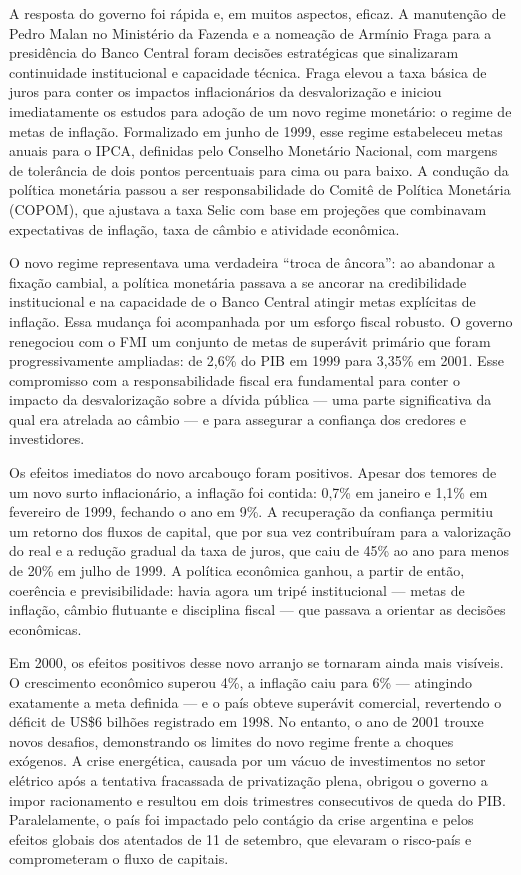 \documentclass[a4paper,12pt]{article}[abntex2]
\begin{document}
A resposta do governo foi rápida e, em muitos aspectos, eficaz. A manutenção de Pedro Malan no Ministério da Fazenda e a nomeação de Armínio Fraga para a presidência do Banco Central foram decisões estratégicas que sinalizaram continuidade institucional e capacidade técnica. Fraga elevou a taxa básica de juros para conter os impactos inflacionários da desvalorização e iniciou imediatamente os estudos para adoção de um novo regime monetário: o regime de metas de inflação. Formalizado em junho de 1999, esse regime estabeleceu metas anuais para o IPCA, definidas pelo Conselho Monetário Nacional, com margens de tolerância de dois pontos percentuais para cima ou para baixo. A condução da política monetária passou a ser responsabilidade do Comitê de Política Monetária (COPOM), que ajustava a taxa Selic com base em projeções que combinavam expectativas de inflação, taxa de câmbio e atividade econômica.

O novo regime representava uma verdadeira “troca de âncora”: ao abandonar a fixação cambial, a política monetária passava a se ancorar na credibilidade institucional e na capacidade de o Banco Central atingir metas explícitas de inflação. Essa mudança foi acompanhada por um esforço fiscal robusto. O governo renegociou com o FMI um conjunto de metas de superávit primário que foram progressivamente ampliadas: de 2,6\% do PIB em 1999 para 3,35\% em 2001. Esse compromisso com a responsabilidade fiscal era fundamental para conter o impacto da desvalorização sobre a dívida pública — uma parte significativa da qual era atrelada ao câmbio — e para assegurar a confiança dos credores e investidores.

Os efeitos imediatos do novo arcabouço foram positivos. Apesar dos temores de um novo surto inflacionário, a inflação foi contida: 0,7\% em janeiro e 1,1\% em fevereiro de 1999, fechando o ano em 9\%. A recuperação da confiança permitiu um retorno dos fluxos de capital, que por sua vez contribuíram para a valorização do real e a redução gradual da taxa de juros, que caiu de 45\% ao ano para menos de 20\% em julho de 1999. A política econômica ganhou, a partir de então, coerência e previsibilidade: havia agora um tripé institucional — metas de inflação, câmbio flutuante e disciplina fiscal — que passava a orientar as decisões econômicas.

Em 2000, os efeitos positivos desse novo arranjo se tornaram ainda mais visíveis. O crescimento econômico superou 4\%, a inflação caiu para 6\% — atingindo exatamente a meta definida — e o país obteve superávit comercial, revertendo o déficit de US\$6 bilhões registrado em 1998. No entanto, o ano de 2001 trouxe novos desafios, demonstrando os limites do novo regime frente a choques exógenos. A crise energética, causada por um vácuo de investimentos no setor elétrico após a tentativa fracassada de privatização plena, obrigou o governo a impor racionamento e resultou em dois trimestres consecutivos de queda do PIB. Paralelamente, o país foi impactado pelo contágio da crise argentina e pelos efeitos globais dos atentados de 11 de setembro, que elevaram o risco-país e comprometeram o fluxo de capitais.
\end{document}
